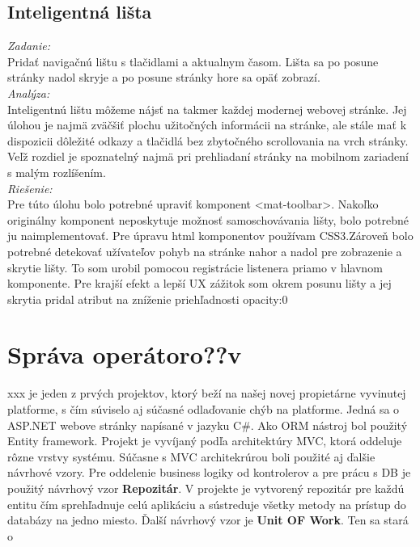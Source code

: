 \documentclass[11pt, oneside]{report}
\begin{document}
\subsection*{Inteligentná lišta }
\textit{Zadanie:}\\
Pridať navigačnú lištu s tlačidlami a aktualnym časom. Lišta sa po posune stránky nadol skryje a po posune stránky hore sa opäť zobrazí.
\\\textit{Analýza:}\\
Inteligentnú lištu môžeme nájsť na takmer každej modernej webovej stránke. Jej úlohou je najmä zväčšiť plochu užitočných informácii na stránke, ale stále mať k dispozicii dôležité odkazy a tlačidlá  bez  zbytočného scrollovania na vrch stránky. Veľž rozdiel je spoznatelný najmä pri prehliadaní stránky na mobilnom zariadení s malým rozlíšením. 
\\\textit{Riešenie:}\\
Pre túto úlohu bolo potrebné upraviť komponent \textsf{<mat-toolbar>}. Nakoľko originálny komponent neposkytuje možnosť samoschovávania lišty, bolo potrebné ju naimplementovať. Pre úpravu html komponentov používam CSS3.Zároveň bolo potrebné detekovať užívateľov pohyb na stránke nahor a nadol pre zobrazenie a skrytie lišty. To som  urobil pomocou registrácie listenera priamo v hlavnom komponente.  Pre krajší efekt a lepší UX  zážitok  som okrem posunu lišty a jej skrytia pridal atribut na zníženie priehľadnosti \textsf{opacity:0}

\section{Správa operátoro??v}
xxx je jeden z prvých projektov, ktorý beží na našej novej propietárne vyvinutej platforme, s čím súviselo aj súčasné odlaďovanie chýb na platforme. Jedná sa o ASP.NET webove stránky napísané v jazyku C\#. Ako ORM nástroj  bol použitý Entity framework. Projekt je vyvíjaný podľa architektúry MVC, ktorá oddeluje rôzne vrstvy systému. Súčasne s MVC architekrúrou boli použité aj ďalšie návrhové vzory. Pre oddelenie business logiky od kontrolerov a pre prácu s DB je použitý návrhový vzor \textbf{Repozitár}. V projekte je vytvorený repozitár pre každú entitu  čím  sprehľadnuje celú aplikáciu a sústreduje všetky metody na prístup do databázy na jedno miesto. Ďalší návrhový vzor je \textbf{Unit OF Work}. Ten sa stará o 


\newpage	


\thispagestyle{empty}
\nocite{*}
\clearpage

\printbibliography
\end{document}
